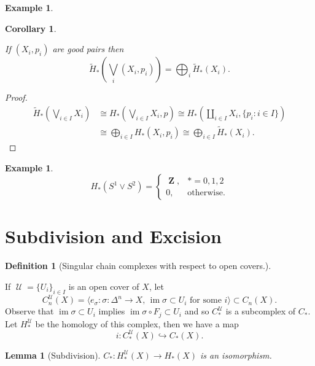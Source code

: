 \documentclass[10pt,]{book}
\theoremstyle{plain}
\newtheorem{corollary}[theorem]{Corollary}
\newtheorem{lemma}[theorem]{Lemma}
\theoremstyle{definition}
\newtheorem{definition}[theorem]{Definition}
\newtheorem{example}[theorem]{Example}
\numberwithin{equation}{section}
\DeclareMathOperator{\im}{im}
\DeclareMathOperator{\ZZ}{\mathbf{Z}}
\DeclareMathOperator{\U}{\mathcal{U}}
\begin{document}
\begin{example}\label{example-14}
\end{example}
\begin{corollary}\label{corollary-5}

              If \((X_i, p_i)\) are good pairs then
              \[
                \tilde H_*\left(\bigvee_{i}(X_i, p_i)\right) = \bigoplus_i \tilde H_*(X_i).
              \]\end{corollary}
\begin{proof}
\begin{align*}
\tilde H_*\left(\bigvee_{i\in I} X_i\right) &\cong H_*\left(\bigvee_{i\in I} X_i, p\right) \cong H_*\left(\coprod_{i\in I} X_i, \{p_i : i\in I\}\right)\\
&\cong \bigoplus_{i\in I} H_*\left(X_i, p_i\right) \cong \bigoplus_{i\in I} \tilde H_*(X_i).
\end{align*}\end{proof}
\begin{example}\label{example-15}
\[
                H_*(S^1 \vee S^2) = \begin{cases}\ZZ, &* = 0,1,2\\0, &\text{otherwise}.\end{cases}
              \]\end{example}
\typeout{************************************************}
\typeout{************************************************}
\section[Subdivision and Excision]{Subdivision and Excision}\label{sec-subdivision}
\begin{definition}[Singular chain complexes with respect to open covers.]\label{definition-18}

            If \(\U = \{U_i\}_{i\in I}\) is an open cover of \(X\), let
            \[
              C^{\U}_n(X) = \langle e_\sigma : \sigma\colon \Delta^n \to X,\,\im\sigma\subset U_i\text{ for some }i\rangle \subset C_n(X).
            \]
            Observe that \(\im \sigma \subset U_i\) implies \(\im \sigma \circ F_j \subset U_i\) and so \(C^{\U}_*\) is a subcomplex of \(C_*\).
            Let \(H^{\U}_*\) be the homology of this complex, then we have a map
            \[
              i\colon C^{\U}_*(X) \hookrightarrow C_*(X).
            \]\end{definition}
\begin{lemma}[Subdivision]\label{lemma-6}
\(C_*\colon H^{\U}_*(X) \to H_*(X)\) is an isomorphism.
          \end{lemma}
\typeout{************************************************}
\typeout{************************************************}
\end{document}
